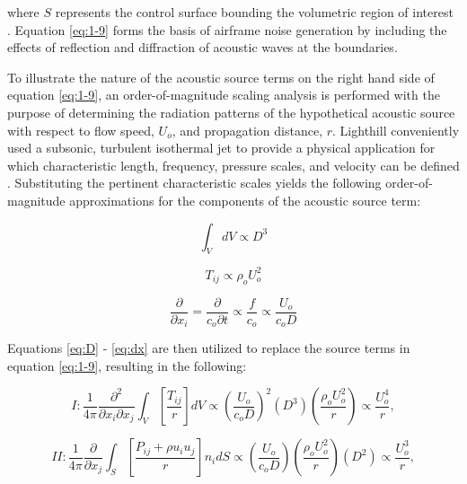 where $S$ represents the control surface bounding the volumetric region of interest \cite{hirschberg2004}. Equation \ref{eq:1-9} forms the basis of airframe noise generation by including the effects of reflection and diffraction of acoustic waves at the boundaries.

To illustrate the nature of the acoustic source terms on the right hand side of equation \ref{eq:1-9}, an order-of-magnitude scaling analysis is performed with the purpose of determining the radiation patterns of the hypothetical acoustic source with respect to flow speed, $U_o$, and propagation distance, $r$. Lighthill conveniently used a subsonic, turbulent isothermal jet to provide a physical application for which characteristic length, frequency, pressure scales, and velocity can be defined \cite{lighthill1954}. Substituting the pertinent characteristic scales yields the following order-of-magnitude approximations for the components of the acoustic source term:

\begin{equation} \label{eq:D}
\int_{V} dV \propto D^3
\end{equation}

\begin{equation} \label{eq:U}
T_{ij} \propto \rho_o U_o^2
\end{equation}

\begin{equation} \label{eq:dx}
\frac{\partial}{\partial x_i} = \frac{\partial}{c_o \partial t} \propto \frac{f}{c_o} \propto \frac{U_o}{c_o D}
\end{equation}

Equations \ref{eq:D} - \ref{eq:dx} are then utilized to replace the source terms in equation \ref{eq:1-9}, resulting in the following:

\begin{equation}
I : \frac{1}{4\pi} \frac{\partial^2}{\partial x_i \partial x_j} \int_V \left[ \frac{T_{ij}}{r} \right] dV \propto \left( \frac{U_o}{c_o D} \right)^2 \left( D^3 \right) \left( \frac{\rho_o U_o^2}{r} \right) \propto \frac{U_o^4}{r},
\end{equation}

\begin{equation}
II : \frac{1}{4\pi} \frac{\partial}{\partial x_j} \int_S \left[ \frac{P_{ij} + \rho u_i u_j}{r} \right] n_i dS \propto \left( \frac{U_o}{c_oD} \right) \left( \frac{\rho_o U_o^2}{r} \right) \left( D^2 \right) \propto \frac{U_o^3}{r},
\end{equation}

